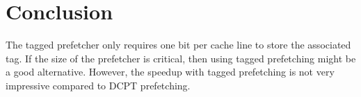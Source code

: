 \section{Conclusion}

The tagged prefetcher only requires one bit per cache line to store the
associated tag. If the size of the prefetcher is critical, then using tagged
prefetching might be a good alternative. However, the speedup with tagged
prefetching is not very impressive compared to DCPT prefetching.

